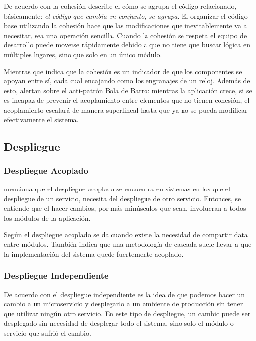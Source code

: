 De acuerdo con \cite{newman2019monolith} la cohesión describe el cómo se agrupa el código relacionado,
básicamente: {\it el código que cambia en conjunto, se agrupa}.
El organizar el código base utilizando la cohesión hace que las modificaciones que inevitablemente
va a necesitar, sea una operación sencilla.
Cuando la cohesión se respeta el equipo de desarrollo puede moverse rápidamente debido a que no tiene
que buscar lógica en múltiples lugares, sino que solo en un único módulo.

Mientras que \cite{percival2020architecture} indica que la cohesión es un indicador de que los componentes
se apoyan entre sí, cada cual encajando como los engranajes de un reloj.
Además de esto, alertan sobre el anti-patrón Bola de Barro: mientras la aplicación crece, si se es incapaz de
prevenir el acoplamiento entre elementos que no tienen cohesión, el acoplamiento escalará de manera superlineal
hasta que ya no se pueda modificar efectivamente el sistema.


\subsection{Despliegue}


\subsubsection{Despliegue Acoplado}

\cite{newman2019monolith} menciona que el despliegue acoplado se encuentra en sistemas en los que el
despliegue de un servicio, necesita del despliegue de otro servicio.
Entonces, se entiende que el hacer cambios, por más minúsculos que sean, involucran a todos los módulos
de la aplicación.

Según \cite{nadareishvili2016microservice} el despliegue acoplado se da cuando existe la necesidad
de compartir data entre módulos.
También indica que una metodología de cascada suele llevar a que la implementación del sistema
quede fuertemente acoplado.


\subsubsection{Despliegue Independiente}

De acuerdo con \cite{newman2019monolith} el despliegue independiente es la idea de que podemos
hacer un cambio a un microservicio y desplegarlo a un ambiente de producción sin tener que utilizar
ningún otro servicio.
En este tipo de despliegue, un cambio puede ser desplegado sin necesidad de desplegar todo el sistema,
sino solo el módulo o servicio que sufrió el cambio.

